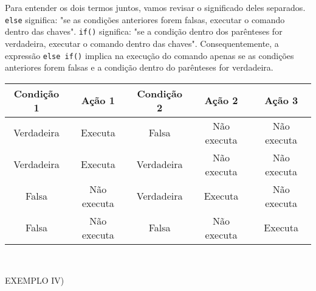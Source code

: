 \documentclass[conference]{IEEEtran}
\begin{document}
\par
Para entender os dois termos juntos, vamos revisar o significado deles separados. \texttt{else} significa: "se as condições anteriores forem falsas, executar o comando dentro das chaves". \texttt{if()} significa: "se a condição dentro dos parênteses for verdadeira, executar o comando dentro das chaves". Consequentemente, a expressão \texttt{else if()} implica na execução do comando apenas se as condições anteriores forem falsas e a condição dentro do parênteses for verdadeira.

\begin{table}[h]
    \centering
    \begin{tabular}{|c|c|c|c|c|}
        \hline
        \textbf{Condição 1} & \textbf{Ação 1} & \textbf{Condição 2} & \textbf{Ação 2} & \textbf{Ação 3} \\
        \hline
        Verdadeira & Executa & Falsa & Não executa & Não executa \\
        \hline
        Verdadeira & Executa & Verdadeira & Não executa & Não executa \\
        \hline
        Falsa & Não executa & Verdadeira & Executa & Não executa \\
        \hline
        Falsa & Não executa & Falsa & Não executa & Executa \\
        \hline
    \end{tabular}
\end{table}
\\
\begin{center}
EXEMPLO IV)
\end{center}
\end{document}
